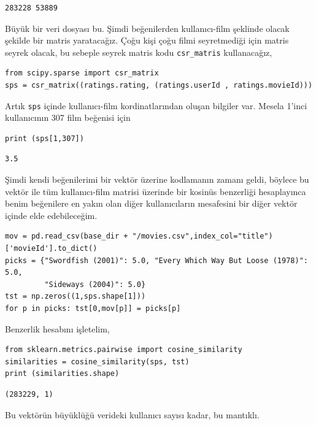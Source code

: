 \documentclass[12pt,fleqn]{article}\usepackage{../../common}
\begin{document}
\begin{verbatim}
283228 53889
\end{verbatim}

Büyük bir veri dosyası bu. Şimdi beğenilerden kullanıcı-film şeklinde olacak
şekilde bir matris yaratacağız. Çoğu kişi çoğu filmi seyretmediği için matris
seyrek olacak, bu sebeple seyrek matris kodu \verb!csr_matris! kullanacağız, 

\begin{verbatim}
from scipy.sparse import csr_matrix
sps = csr_matrix((ratings.rating, (ratings.userId , ratings.movieId)))
\end{verbatim}

Artık \verb!sps! içinde kullanıcı-film kordinatlarından oluşan bilgiler
var. Mesela 1'inci kullanıcının 307 film beğenisi için

\begin{verbatim}
print (sps[1,307])
\end{verbatim}

\begin{verbatim}
3.5
\end{verbatim}

Şimdi kendi beğenilerimi bir vektör üzerine kodlamanın zamanı geldi, böylece
bu vektör ile tüm kullanıcı-film matrisi üzerinde bir kosinüs benzerliği
hesaplayınca benim beğenilere en yakın olan diğer kullanıcıların mesafesini
bir diğer vektör içinde elde edebileceğim.

\begin{verbatim}
mov = pd.read_csv(base_dir + "/movies.csv",index_col="title")['movieId'].to_dict()
picks = {"Swordfish (2001)": 5.0, "Every Which Way But Loose (1978)": 5.0,
         "Sideways (2004)": 5.0}
tst = np.zeros((1,sps.shape[1]))
for p in picks: tst[0,mov[p]] = picks[p]
\end{verbatim}

Benzerlik hesabını işletelim,

\begin{verbatim}
from sklearn.metrics.pairwise import cosine_similarity
similarities = cosine_similarity(sps, tst)
print (similarities.shape)
\end{verbatim}

\begin{verbatim}
(283229, 1)
\end{verbatim}

Bu vektörün büyüklüğü verideki kullanıcı sayısı kadar, bu mantıklı.
\end{document}
